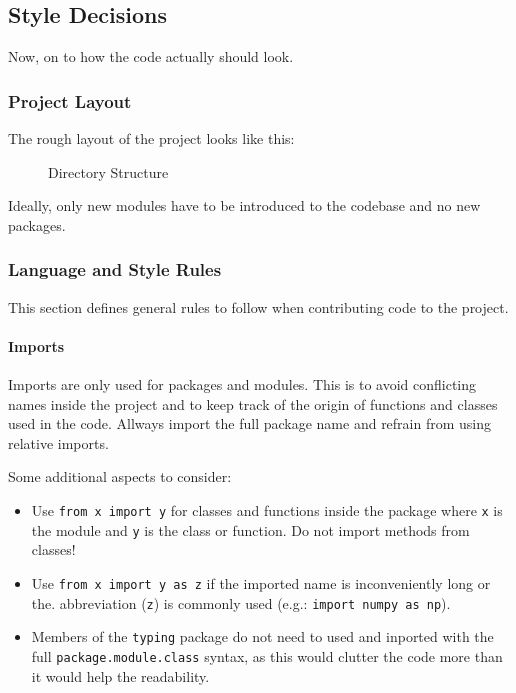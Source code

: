 \newpage

\subsection{Style Decisions}\label{sub:descitions}
Now, on to how the code actually should look.

\subsubsection{Project Layout}
The rough layout of the project looks like this: 

\begin{figure}[!ht]
    \caption{Directory Structure}
\end{figure}

Ideally, only new modules have to be introduced to the codebase and no new
packages.

\newpage

\subsubsection{Language and Style Rules}
This section defines general rules to follow when contributing code to the
project.

\paragraph{Imports} Imports are only used for packages and modules. This is to
avoid conflicting names inside the project and to keep track of the origin of
functions and classes used in the code. Allways import the full package name
and refrain from using relative imports.

Some additional aspects to consider:

\begin{itemize}
    \item Use \texttt{from x import y} for classes and functions inside the
        package where \texttt{x} is the module and \texttt{y} is the class or
        function. Do not import methods from classes!
    \item Use \texttt{from x import y as z} if the imported name is
        inconveniently long or the.  abbreviation (\texttt{z}) is commonly used
        (e.g.: \texttt{import numpy as np}).
    \item Members of the \texttt{typing} package do not need to used and
        inported with the full \texttt{package.module.class} syntax, as this
        would clutter the code more than it would help the readability.
\end{itemize}

